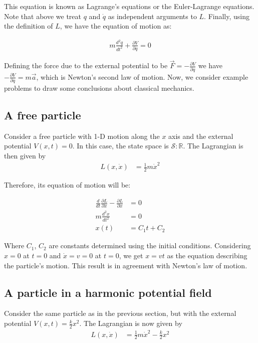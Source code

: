 \documentclass[book.tex]{subfiles}
\begin{document}
This equation is known as Lagrange's equations or the Euler-Lagrange equations. Note that above we treat $q$ and $\dot{q}$ as independent arguments to $L$. Finally, using the definition of $L$, we have the equation of motion as:

\begin{align}\label{motion}
m \frac{d^2q}{dt^2} + \frac{\partial V}{\partial q}= 0
\end{align}

Defining the force due to the external potential to be $\vec{F} =- \frac{\partial V}{\partial q}$ we have $- \frac{\partial V}{\partial q} = m\vec{a}$, which is Newton's second law of motion. Now, we consider example problems to draw some conclusions about classical mechanics.


\subsection{A free particle}

Consider a free particle with 1-D motion along the $x$ axis and the external potential $V(x,t)=0$. In this case, the state space is $\mathcal{S} : \mathbb{R}$. The Lagrangian is then given by
\begin{align}
L(x, \dot{x}) &= \frac{1}{2} m \dot{x}^2
\end{align}

Therefore, its equation of motion will be:

\begin{align}\label{exmp1}
\frac{d}{dt} \frac{\partial L}{\partial \dot{x}} - \frac{\partial L}{\partial x} &= 0 \\
m \frac{d^2x}{dt^2} &= 0 \\ x(t) &= C_1t + C_2 
\end{align}

Where $C_1$, $C_2$ are constants determined using the initial conditions. Considering $x=0$ at $t=0$ and $\dot{x}=v=0$ at $t=0$, we get $x=vt$ as the equation describing the particle's motion. This result is in agreement with Newton's law of motion.

\subsection{A particle in a harmonic potential field}

Consider the same particle as in the previous section, but with the external potential $V(x,t)= \frac{k}{2}x^2$. The Lagrangian is now given by
\begin{align}
    L(x, \dot{x}) &= \frac{1}{2}m\dot{x}^2 - \frac{k}{2}x^2
\end{align}
\end{document}
